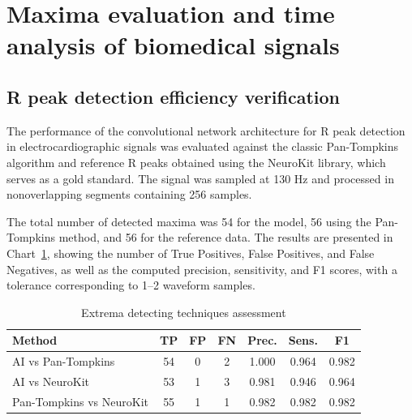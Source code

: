 \documentclass[journal]{IEEEtran}
\begin{document}
\newpage
\section{Maxima evaluation and time analysis of biomedical signals}
\subsection{R peak detection efficiency verification}
The performance of the convolutional network architecture for R peak detection in electrocardiographic signals was evaluated against the classic Pan-Tompkins algorithm and reference R peaks obtained using the NeuroKit library, which serves as a gold standard. The signal was sampled at 130 Hz and processed in nonoverlapping segments containing 256 samples.

The total number of detected maxima was 54 for the model, 56 using the Pan-Tompkins method, and 56 for the reference data. The results are presented in Chart~\ref{tab:peak_comparison}, showing the number of True Positives, False Positives, and False Negatives, as well as the computed precision, sensitivity, and F1 scores, with a tolerance corresponding to 1–2 waveform samples.

\begin{table}[ht]
\caption{Extrema detecting techniques assessment}
\label{tab:peak_comparison}
\centering
\begin{tabular}{|p{3.08cm}|c|c|c|c|c|c|}
\hline
\textbf{Method} & \textbf{TP} & \textbf{FP} & \textbf{FN} & \textbf{Prec.} & \textbf{Sens.} & \textbf{F1} \\
\hline
AI vs Pan-Tompkins & 54 & 0 & 2 & 1.000 & 0.964 & 0.982 \\
AI vs NeuroKit & 53 & 1 & 3 & 0.981 & 0.946 & 0.964 \\
Pan-Tompkins vs NeuroKit & 55 & 1 & 1 & 0.982 & 0.982 & 0.982 \\
\hline
\end{tabular}
\end{table}
\end{document}
